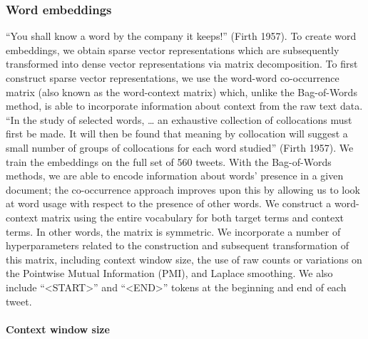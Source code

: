\documentclass{article}
\begin{document}
\hypertarget{word-embeddings}{%
\subsubsection{Word embeddings}\label{word-embeddings}}

``You shall know a word by the company it keeps!'' (Firth 1957). To
create word embeddings, we obtain sparse vector representations which
are subsequently transformed into dense vector representations via
matrix decomposition. To first construct sparse vector representations,
we use the word-word co-occurrence matrix (also known as the
word-context matrix) which, unlike the Bag-of-Words method, is able to
incorporate information about context from the raw text data. ``In the
study of selected words, \ldots{} an exhaustive collection of
collocations must first be made. It will then be found that meaning by
collocation will suggest a small number of groups of collocations for
each word studied'' (Firth 1957). We train the embeddings on the full
set of 560 tweets. With the Bag-of-Words methods, we are able to encode
information about words' presence in a given document; the co-occurrence
approach improves upon this by allowing us to look at word usage with
respect to the presence of other words. We construct a word-context
matrix using the entire vocabulary for both target terms and context
terms. In other words, the matrix is symmetric. We incorporate a number
of hyperparameters related to the construction and subsequent
transformation of this matrix, including context window size, the use of
raw counts or variations on the Pointwise Mutual Information (PMI), and
Laplace smoothing. We also include ``\textless START\textgreater{}'' and
``\textless END\textgreater{}'' tokens at the beginning and end of each
tweet.

\hypertarget{context-window-size}{%
\paragraph{Context window size}\label{context-window-size}}
\end{document}
